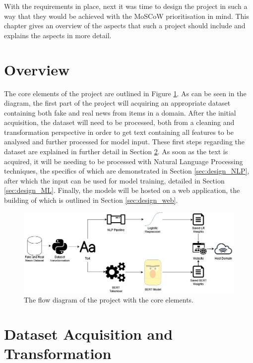 \documentclass{l4proj}
\begin{document}
With the requirements in place, next it was time to design the project in such a way that they would be achieved with the MoSCoW prioritisation in mind. This chapter gives an overview of the aspects that such a project should include and explains the aspects in more detail.

\section{Overview}
\label{sec:design_overview}

The core elements of the project are outlined in Figure \ref{fig:design}. As can be seen in the diagram, the first part of the project will acquiring an appropriate dataset containing both fake and real news from items in a domain. After the initial acquisition, the dataset will need to be processed, both from a cleaning and transformation perspective in order to get text containing all features to be analysed and further processed for model input. These first steps regarding the dataset are explained in further detail in Section \ref{sec:design_dataset}. As soon as the text is acquired, it will be needing to be processed with Natural Language Processing techniques, the specifics of which are demonstrated in Section \ref{sec:design_NLP}, after which the input can be used for model training, detailed in Section \ref{sec:design_ML}. Finally, the models will be hosted on a web application, the building of which is outlined in Section \ref{sec:design_web}.

\begin{figure}
    \centering
    \includegraphics[width=1\linewidth]{images/diss-design-final.drawio.png}    

    \caption{The flow diagram of the project with the core elements\protect\footnotemark.}
    \label{fig:design} 
\end{figure}


\section{Dataset Acquisition and Transformation}
\label{sec:design_dataset}
\end{document}
